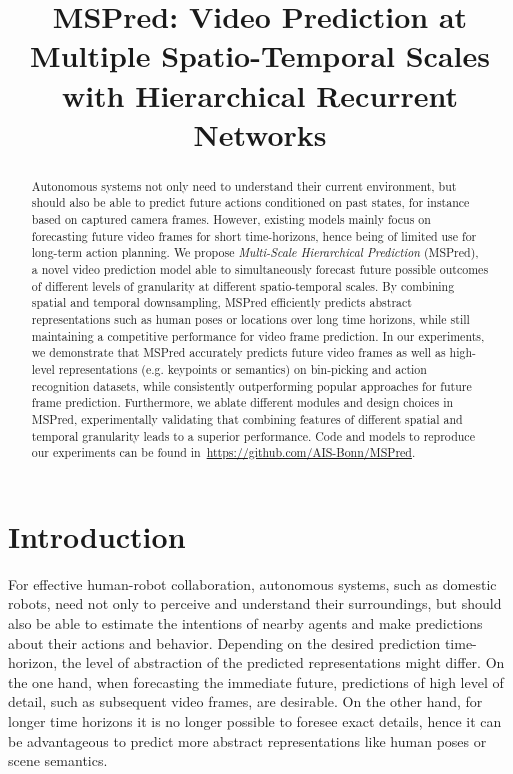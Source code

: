 \documentclass{bmvc2k}
\title{MSPred: Video Prediction at Multiple Spatio-Temporal Scales with	Hierarchical Recurrent Networks}
\let\svthefootnote\thefootnote
\newcommand\freefootnote[1]{\let\thefootnote\relax \footnotetext{#1}\let\thefootnote\svthefootnote } \usepackage{graphicscache}
\begin{document}
\maketitle
\freefootnote{ denotes equal contribution.}

\vspace{-0.5cm}
\begin{abstract}
	\vspace{-0.1cm}
	Autonomous systems not only need to understand their current environment, but should also
	be able to predict future actions conditioned on past states, for instance based on captured camera frames.
However, existing models mainly focus on forecasting future video frames for short time-horizons, hence being of limited use for long-term action planning.
We propose \emph{Multi-Scale Hierarchical Prediction} (MSPred), a novel video prediction model able
	to simultaneously forecast future possible outcomes of different levels of
	granularity at different spatio-temporal scales. By combining spatial and temporal downsampling, MSPred efficiently predicts abstract representations such as human poses or locations over long time horizons, while still maintaining a competitive performance for video frame prediction.
In our experiments, we demonstrate that MSPred accurately predicts future video frames as well as high-level representations (e.g. keypoints or semantics) on bin-picking and action recognition datasets, while consistently outperforming popular approaches for future frame prediction.
Furthermore, we ablate different modules and design choices in MSPred, experimentally validating that combining features of different spatial and temporal granularity leads to a superior performance.
Code and models to reproduce our experiments can be found in~\url{https://github.com/AIS-Bonn/MSPred}.
\end{abstract}


\vspace{-0.3cm}
\section{Introduction}
\vspace{-0.3cm}

For effective human-robot collaboration, autonomous systems, such as domestic robots, need not only to perceive and understand their surroundings, but should also be able to estimate the intentions of nearby agents and make predictions about their actions and behavior.
Depending on the desired prediction time-horizon, the level of abstraction of the predicted representations might differ.
On the one hand, when forecasting the immediate future, predictions of high level of detail, such as subsequent video frames, are desirable.
On the other hand, for longer time horizons it is no longer possible to foresee exact details, hence it can be advantageous to predict more abstract representations like human poses or scene semantics.
\end{document}
